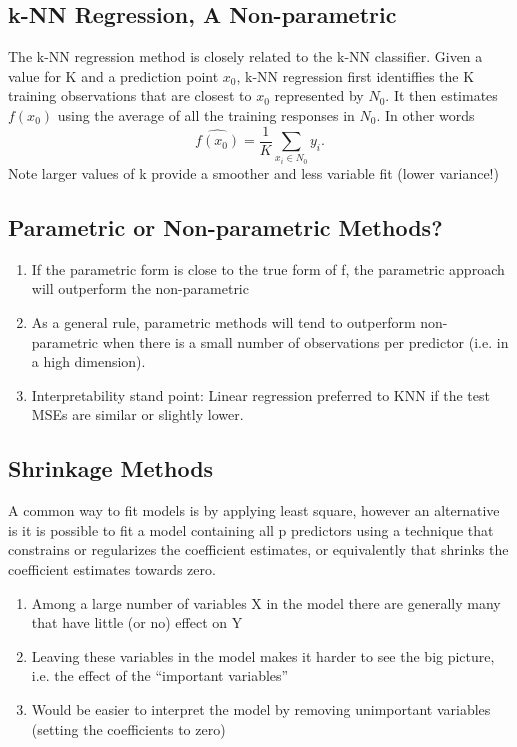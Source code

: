\documentclass[12pt]{article}
\numberwithin{equation}{section}
\begin{document}
\subsection{k-NN Regression, A Non-parametric}
The k-NN regression method is closely related to the k-NN classifier. Given a value for K and a prediction point $x_0$, k-NN regression first identiffies the K training observations that are closest to $x_0$ represented by $N_0$. It then estimates $f(x_0)$ using the average of all the training responses in $N_0$. In other words
\begin{equation}
    \hat{f(x_0)} = \frac{1}{K} \sum_{x_i \in N_0} y_i.
\end{equation}
Note larger values of k provide a smoother and less variable fit (lower variance!)

\subsection{Parametric or Non-parametric Methods?}
\begin{enumerate}
    \item  If the parametric form is close to the true form of f, the parametric approach will outperform the non-parametric
    \item As a general rule, parametric methods will tend to outperform non-parametric when there is a small number of observations per predictor (i.e. in a high dimension).
    \item Interpretability stand point: Linear regression preferred to KNN if the test MSEs are similar or slightly lower.
\end{enumerate}

\subsection{Shrinkage Methods}
A common way to fit models is by applying least square, however an alternative is it is possible to fit a model containing all p predictors using a technique that constrains or regularizes the coefficient estimates, or equivalently that shrinks the coefficient estimates towards zero.
\begin{enumerate}
    \item Among a large number of variables X in the model there are generally many that have little (or no) effect on Y
    \item Leaving these variables in the model makes it harder to see the big picture, i.e. the effect of the “important variables”
    \item Would be easier to interpret the model by removing unimportant variables (setting the coefficients to zero)
\end{enumerate}
\end{document}
